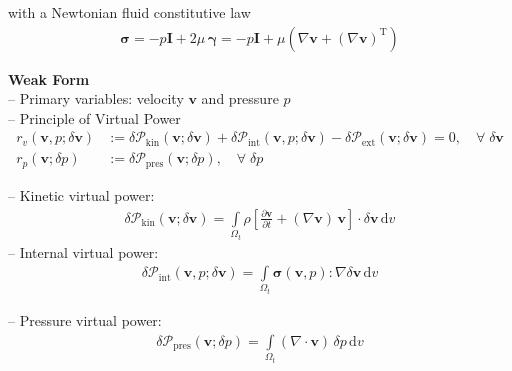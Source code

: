 \documentclass[a4paper,12pt]{report}
\newcommand{\bs}[1]{\boldsymbol{#1}}
\newcommand{\Om}{\mathit{\Omega}}
\begin{document}
with a Newtonian fluid constitutive law
\begin{align}
\bs{\sigma} = -p \bs{I} + 2 \mu\,\bs{\gamma} = -p \bs{I} + \mu \left(\nabla \bs{v} + (\nabla \bs{v})^{\mathrm{T}}\right)
\end{align}

\textbf{Weak Form}\\

-- Primary variables: velocity $\bs{v}$ and pressure $p$\\

-- Principle of Virtual Power
\begin{equation}
\label{equation-fluid-weak-form}
\begin{aligned}
r_v(\bs{v},p;\delta\bs{v}) &:= \delta \mathcal{P}_{\mathrm{kin}}(\bs{v};\delta\bs{v}) + \delta \mathcal{P}_{\mathrm{int}}(\bs{v},p;\delta\bs{v}) - \delta \mathcal{P}_{\mathrm{ext}}(\bs{v};\delta\bs{v}) = 0, \quad \forall \; \delta\bs{v} \\
r_p(\bs{v};\delta p) &:= \delta \mathcal{P}_{\mathrm{pres}}(\bs{v};\delta p), \quad \forall \; \delta p
\end{aligned}
\end{equation}

-- Kinetic virtual power:
\begin{equation}
\label{equation-deltap-kin}
\begin{aligned}
\delta \mathcal{P}_{\mathrm{kin}}(\bs{v};\delta\bs{v}) = \int\limits_{\Om_t} \rho\left[\frac{\partial\bs{v}}{\partial t} + (\nabla\bs{v})\,\bs{v}\right] \cdot \delta\bs{v} \,\mathrm{d}v
\end{aligned}
\end{equation}
-- Internal virtual power:
\begin{equation}
\label{equation-deltap-int}
\begin{aligned}
\delta \mathcal{P}_{\mathrm{int}}(\bs{v},p;\delta\bs{v}) = 
\int\limits_{\Om_t} \bs{\sigma}(\bs{v},p) : \nabla \delta\bs{v} \,\mathrm{d}v 
\end{aligned}
\end{equation}

-- Pressure virtual power:
\begin{equation}
\label{equation-deltap-p}
\begin{aligned}
\delta \mathcal{P}_{\mathrm{pres}}(\bs{v};\delta p) = 
\int\limits_{\Om_t} (\nabla\cdot\bs{v})\,\delta p\,\mathrm{d}v
\end{aligned}
\end{equation}
\end{document}
